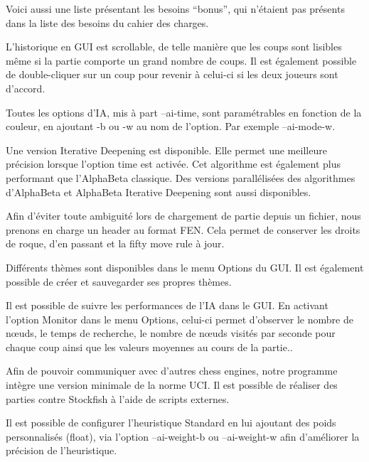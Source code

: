 \documentclass{article}
\begin{document}
Voici aussi une liste présentant les besoins ``bonus'', qui n'étaient pas présents dans la liste des besoins du cahier des charges.

\begin{needbox}
    L'historique en GUI est scrollable, de telle manière que les coups sont lisibles même si la partie
    comporte un grand nombre de coups. Il est également possible de double-cliquer sur un coup pour revenir à celui-ci si les deux joueurs sont d'accord.
\end{needbox}

\begin{needbox}[F62: IA paramétrable]
   Toutes les options d'IA, mis à part --ai-time, sont paramétrables en fonction de la couleur, en ajoutant 
   -b ou -w au nom de l'option. Par exemple --ai-mode-w.
\end{needbox}

\begin{needbox}
   Une version Iterative Deepening est disponible. Elle permet une meilleure précision lorsque l'option time est activée. Cet algorithme est également plus performant que l'AlphaBeta classique.
   Des versions parallélisées des algorithmes d'AlphaBeta et AlphaBeta Iterative Deepening sont aussi disponibles.
\end{needbox}

\begin{needbox}
   Afin d'éviter toute ambiguité lors de chargement de partie depuis un fichier, nous prenons en charge un header au format FEN. Cela permet de conserver les droits de roque, d'en passant et la fifty move rule à jour.
\end{needbox}

\begin{needbox}
    Différents thèmes sont disponibles dans le menu Options du GUI. Il est également possible de créer et sauvegarder ses propres thèmes.
\end{needbox}

\begin{needbox}[F66: Monitoring de l'IA]
    Il est possible de suivre les performances de l'IA dans le GUI. En activant l'option Monitor dans le menu Options, celui-ci permet d'observer le nombre de nœuds, le temps de recherche, le nombre de nœuds visités par seconde pour chaque coup ainsi que les valeurs moyennes au cours de la partie..
\end{needbox}

\begin{needbox}
    Afin de pouvoir communiquer avec d'autres chess engines, notre programme intègre une version minimale de la norme UCI. Il est possible de réaliser des parties contre Stockfish à l'aide de scripts externes.
\end{needbox}

\begin{needbox}
    Il est possible de configurer l'heuristique Standard en lui ajoutant des poids personnalisés (float), via l'option --ai-weight-b ou --ai-weight-w afin d'améliorer la précision de l'heuristique.
\end{needbox}
\end{document}
